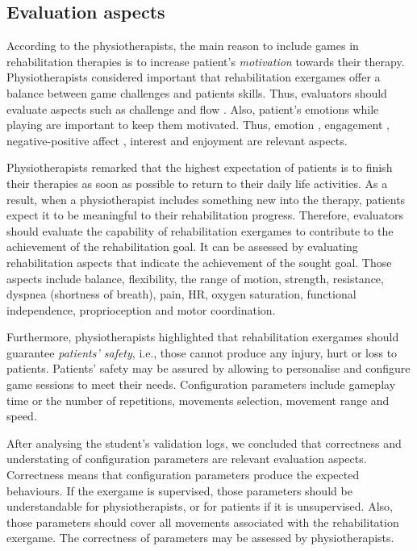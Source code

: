 \subsection{Evaluation aspects}
\label{sec:rehab_aspects}
According to the physiotherapists, the main reason to include games in rehabilitation therapies is to increase patient’s \textit{motivation} towards their therapy. Physiotherapists considered important that rehabilitation exergames offer a balance between game challenges and patients skills. Thus, evaluators should evaluate aspects such as challenge \autocite{Moosajee,Nacke2009,VandenAbeele2016,Wiemeyer2016,Desurvire2009} and flow \autocite{Sinclair2007,Lapas2015,Bernhaupt2015,Nacke2009,Wiemeyer2016,Nijholt2008}. Also, patient's emotions while playing are important to keep them motivated. Thus, emotion \autocite{Bernhaupt2015,Sanchez2009,Wiemeyer2016}, engagement \autocite{Yanez-Gomez2017,Wiemeyer2016}, negative-positive affect \autocite{Nacke2009}, interest \autocite{VandenAbeele2016} and enjoyment \autocite{Ho2017,Li2016,VandenAbeele2016,Zhao2016,Li2006,Berkovsky2010} are relevant aspects.

Physiotherapists remarked that the highest expectation of patients is to finish their therapies as soon as possible to return to their daily life activities. As a result, when a physiotherapist includes something new into the therapy, patients expect it to be meaningful to their rehabilitation progress. Therefore, evaluators should evaluate the capability of rehabilitation exergames to contribute to the achievement of the rehabilitation goal. It can be assessed by evaluating rehabilitation aspects that indicate the achievement of the sought goal. Those aspects include balance, flexibility, the range of motion, strength, resistance, dyspnea (shortness of breath), pain, \ac{HR}, oxygen saturation, functional independence, proprioception and motor coordination.

Furthermore, physiotherapists highlighted that rehabilitation exergames should guarantee \textit{patients' safety}, i.e., those cannot produce any injury, hurt or loss to patients. Patients' safety may be assured by allowing to personalise and configure game sessions to meet their needs. Configuration parameters include gameplay time or the number of repetitions, movements selection, movement range and speed. 

After analysing the student's validation logs, we concluded that correctness and understating of configuration parameters are relevant evaluation aspects. Correctness means that configuration parameters produce the expected behaviours. If the exergame is supervised, those parameters should be understandable for physiotherapists, or for patients if it is unsupervised. Also, those parameters should cover all movements associated with the rehabilitation exergame. The correctness of parameters may be assessed by physiotherapists.

